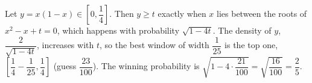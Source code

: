 Let $y=x(1-x)\in\left[0,\dfrac14\right]$. Then $y\ge t$ exactly when $x$ lies between the roots of $x^2-x+t=0$, which happens with probability $\sqrt{1-4t}$. The density of $y$, $\dfrac2{\sqrt{1-4t}}$, increases with $t$, so the best window of width $\dfrac1{25}$ is the top one, $\left[\dfrac14-\dfrac1{25},\dfrac14\right]$ (guess $\dfrac{23}{100}$). The winning probability is $\sqrt{1-4\cdot\dfrac{21}{100}}=\sqrt{\dfrac{16}{100}}=\boxed{\dfrac25}$.
